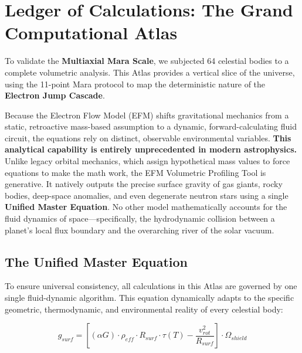 \documentclass[11pt, a4paper]{article}
\begin{document}
\clearpage
\section{Ledger of Calculations: The Grand Computational Atlas}

  To validate the \textbf{Multiaxial Mara Scale}, we subjected 64 celestial bodies to a complete volumetric analysis. This Atlas provides a vertical slice of the universe, using the 11-point Mara protocol to map the deterministic nature of the \textbf{Electron Jump Cascade}.

  Because the Electron Flow Model (EFM) shifts gravitational mechanics from a static, retroactive mass-based assumption to a dynamic, forward-calculating fluid circuit, the equations rely on distinct, observable environmental variables. \textbf{This analytical capability is entirely unprecedented in modern astrophysics.} Unlike legacy orbital mechanics, which assign hypothetical mass values to force equations to make the math work, the EFM Volumetric Profiling Tool is generative. It natively outputs the precise surface gravity of gas giants, rocky bodies, deep-space anomalies, and even degenerate neutron stars using a single \textbf{Unified Master Equation}. No other model mathematically accounts for the fluid dynamics of space---specifically, the hydrodynamic collision between a planet's local flux boundary and the overarching river of the solar vacuum.
  
\vspace{1.5em}
\subsection{The Unified Master Equation}
  To ensure universal consistency, all calculations in this Atlas are governed by one single fluid-dynamic algorithm. This equation dynamically adapts to the specific geometric, thermodynamic, and environmental reality of every celestial body:

  \begin{equation}
    g_{surf} = \left[ (\alpha G) \cdot \rho_{eff} \cdot R_{surf} \cdot \tau(T) - \frac{v_{rot}^2}{R_{surf}} \right] \cdot \Omega_{shield}
  \end{equation}
\end{document}
